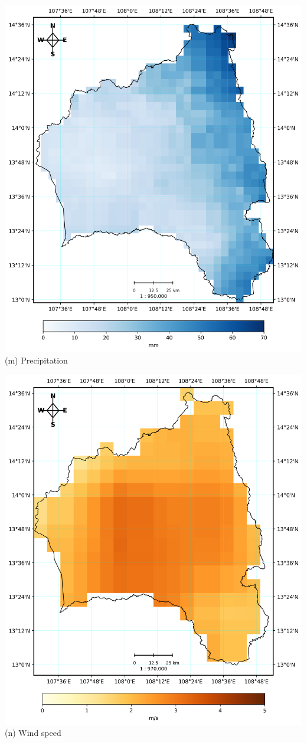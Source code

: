 \documentclass{article}
\begin{document}
\noindent
\begin{minipage}{0.31\textwidth}
    \includegraphics[width=\textwidth]{Precipitation.png}
    \centering (m) Precipitation
\end{minipage}%
\hfill
\begin{minipage}{0.31\textwidth}
    \includegraphics[width=\textwidth]{WindSpeed.png}
    \centering (n) Wind speed
\end{minipage}%
\end{document}
